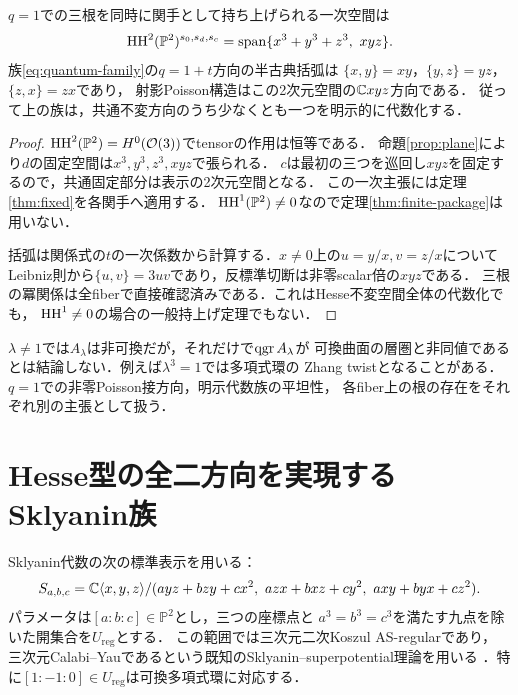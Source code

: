 \begin{proposition}[Hesse不変方向と半古典極限]\label{prop:quantum-tangent}
$q=1$での三根を同時に関手として持ち上げられる一次空間は
\[
 \operatorname{HH}^2(\mathbb P^2)^{s_0,s_d,s_c}
 =\operatorname{span}\{x^3+y^3+z^3,\ xyz\}.
\]
族\eqref{eq:quantum-family}の$q=1+t$方向の半古典括弧は
$\{x,y\}=xy$，$\{y,z\}=yz$，$\{z,x\}=zx$であり，
射影Poisson構造はこの2次元空間の$\mathbb C xyz$方向である．
従って上の族は，共通不変方向のうち少なくとも一つを明示的に代数化する．
\end{proposition}
\begin{proof}
$\operatorname{HH}^2(\mathbb P^2)=H^0(\mathcal O(3))$でtensorの作用は恒等である．
命題\ref{prop:plane}により$d$の固定空間は$x^3,y^3,z^3,xyz$で張られる．
$c$は最初の三つを巡回し$xyz$を固定するので，共通固定部分は表示の2次元空間となる．
この一次主張には定理\ref{thm:fixed}を各関手へ適用する．
$\operatorname{HH}^1(\mathbb P^2)\ne0$なので定理\ref{thm:finite-package}は用いない．

括弧は関係式の$t$の一次係数から計算する．$x\ne0$上の$u=y/x,v=z/x$について
Leibniz則から$\{u,v\}=3uv$であり，反標準切断は非零scalar倍の$xyz$である．
三根の冪関係は全fiberで直接確認済みである．これはHesse不変空間全体の代数化でも，
$\operatorname{HH}^1\ne0$の場合の一般持上げ定理でもない．
\end{proof}

\begin{remark}[非可換な環と非可換な圏]
$\lambda\ne1$では$A_\lambda$は非可換だが，それだけで$\operatorname{qgr} A_\lambda$が
可換曲面の層圏と非同値であるとは結論しない．例えば$\lambda^3=1$では多項式環の
Zhang twistとなることがある．$q=1$での非零Poisson接方向，明示代数族の平坦性，
各fiber上の根の存在をそれぞれ別の主張として扱う．
\end{remark}


\section{Hesse型の全二方向を実現するSklyanin族}\label{sec:hesse-sklyanin}
Sklyanin代数の次の標準表示を用いる：
\begin{equation}\label{eq:sklyanin-hesse}
 S_{a,b,c}=\mathbb C\langle x,y,z\rangle/
 (ayz+bzy+cx^2,\ azx+bxz+cy^2,\ axy+byx+cz^2).
\end{equation}
パラメータは$[a:b:c]\in\mathbb P^2$とし，三つの座標点と
$a^3=b^3=c^3$を満たす九点を除いた開集合を$U_{\mathrm{reg}}$とする．
この範囲では三次元二次Koszul AS-regularであり，
三次元Calabi--Yauであるという既知のSklyanin--superpotential理論を用いる
\cite{ATVSk,MoriSmith,DeLaet}．特に$[1:-1:0]\in U_{\mathrm{reg}}$は可換多項式環に対応する．

